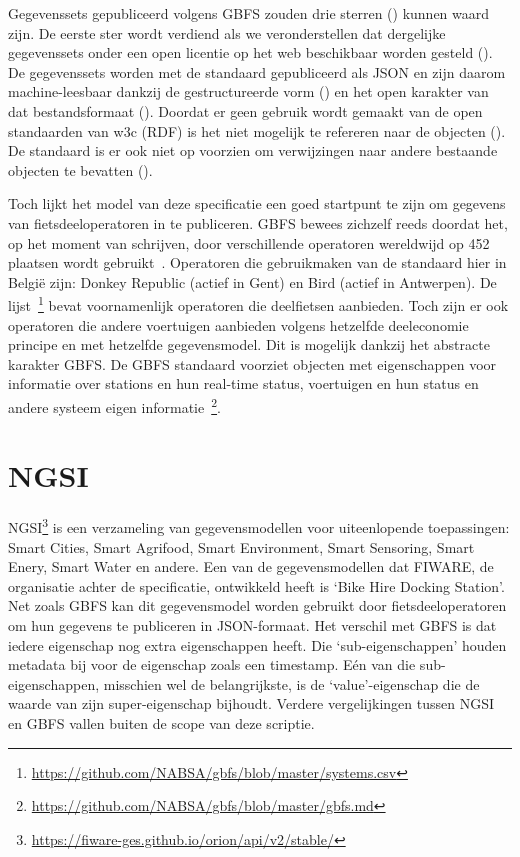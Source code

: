 Gegevenssets gepubliceerd volgens GBFS zouden drie sterren (\ast \ast \ast) kunnen waard zijn.
De eerste ster wordt verdiend als we veronderstellen dat dergelijke gegevenssets onder een open licentie op het web beschikbaar worden gesteld (\ast). De gegevenssets worden met de standaard gepubliceerd als JSON en zijn daarom machine-leesbaar dankzij de gestructureerde vorm (\ast \ast) en het open karakter van dat bestandsformaat (\ast \ast \ast). Doordat er geen gebruik wordt gemaakt van de open standaarden van w3c (RDF) is het niet mogelijk te refereren naar de objecten (\sout{\ast \ast \ast \ast}). De standaard is er ook niet op voorzien om verwijzingen naar andere bestaande objecten te bevatten (\sout{\ast \ast \ast \ast \ast}).

Toch lijkt het model van deze specificatie een goed startpunt te zijn om gegevens van fietsdeeloperatoren in te publiceren. GBFS bewees zichzelf reeds doordat het, op het moment van schrijven,  door verschillende operatoren wereldwijd op 452 plaatsen wordt gebruikt~\cite{GBFS_systems}. Operatoren die gebruikmaken van de standaard hier in België zijn: Donkey Republic (actief in Gent) en Bird (actief in Antwerpen). De lijst~\footnote{\url{https://github.com/NABSA/gbfs/blob/master/systems.csv}} bevat voornamenlijk operatoren die deelfietsen aanbieden. Toch zijn er ook operatoren die andere voertuigen aanbieden volgens hetzelfde \gls{deeleconomie} principe en met hetzelfde gegevensmodel. Dit is mogelijk dankzij het abstracte karakter GBFS. De GBFS standaard voorziet objecten met eigenschappen voor informatie over stations en hun real-time status, voertuigen en hun status en andere systeem eigen informatie~\footnote{\url{https://github.com/NABSA/gbfs/blob/master/gbfs.md}}.

\section{NGSI}
\label{sec:ngsi}
NGSI\footnote{\url{https://fiware-ges.github.io/orion/api/v2/stable/}} is een verzameling van gegevensmodellen voor uiteenlopende toepassingen: Smart Cities, Smart Agrifood, Smart Environment, Smart Sensoring, Smart Enery, Smart Water en andere. Een van de gegevensmodellen dat FIWARE, de organisatie achter de specificatie, ontwikkeld heeft is `Bike Hire Docking Station'. Net zoals GBFS kan dit gegevensmodel worden gebruikt door fietsdeeloperatoren om hun gegevens te publiceren in JSON-formaat. Het verschil met GBFS is dat iedere eigenschap nog extra eigenschappen heeft. Die `sub-eigenschappen' houden metadata bij voor de eigenschap zoals een timestamp. Eén van die sub-eigenschappen, misschien wel de belangrijkste, is de `value'-eigenschap die de waarde van zijn super-eigenschap bijhoudt. Verdere vergelijkingen tussen NGSI en GBFS vallen buiten de scope van deze scriptie.

